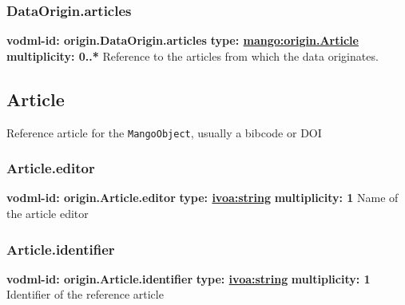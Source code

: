     \subsubsection{DataOrigin.articles}
    \textbf{vodml-id: origin.DataOrigin.articles} \newline
    \textbf{type: \hyperref[sect:origin.Article]{mango:origin.Article}} \newline
    \textbf{multiplicity: 0..*} \newline
    Reference to the articles from which the data originates.

  \subsection{Article}
    \label{sect:origin.Article}
    Reference article for the \texttt{MangoObject}, usually a bibcode or DOI

    \subsubsection{Article.editor}
    \textbf{vodml-id: origin.Article.editor} \newline
    \textbf{type: \hyperref[sect:ivoa]{ivoa:string}} \newline
    \textbf{multiplicity: 1} \newline
    Name of the article editor

    \subsubsection{Article.identifier}
    \textbf{vodml-id: origin.Article.identifier} \newline
    \textbf{type: \hyperref[sect:ivoa]{ivoa:string}} \newline
    \textbf{multiplicity: 1} \newline
    Identifier of the reference article

